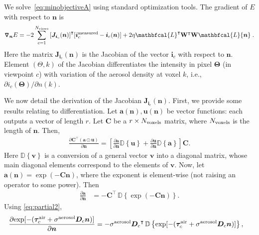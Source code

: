 \documentclass[10pt,letterpaper]{article}
\newcommand{\Grad}[1]{\bm{\triangledown_{#1}}}
\newcommand{\PartDeriv}[2]{\frac{\partial{#1}}{\partial{#2}}}
\newcommand{\vect}[1]{\bm{#1}}
\newcommand{\mat}[1]{\bm{#1}}
\newcommand{\transpose}[1]{{#1}^\intercal}
\newcommand{\OpDistance}{\bm{D}}
\newcommand{\Laplacian}{\mathbfcal{L}}
\newcommand{\OpDiag}[1]{\mathbb{D}\left\{#1\right\}}
\begin{document}
We solve~\cref{eq:minobjectiveA} using standard optimization tools.
The gradient of $E$ with respect to ${\bm n}$ is
\begin{align}
  \Grad{{\bm n}} E = -2\sum_{c=1}^{N_{\rm views}}
  \transpose{\left[{\bm J}_{{\bm i}_c}({\bm n})\right]} [{\bm i}^{\rm
    measured}_c - {\bm i}_c({\bm n})] + 2 \eta
  \transpose{\Laplacian}\transpose{{\bf W}}{\bf W}\Laplacian{\bm n}
  \;.
  \label{eq:gradient1}
\end{align}
Here the matrix ${\bm J}_{{\bm i}_c}({\bm n})$ is the Jacobian of the
vector ${\bm i}_c$ with respect to ${\bm n}$.  Element $(\Theta,k)$ of
the Jacobian differentiates the intensity in pixel ${\bm \Theta}$ (in
viewpoint $c$) with variation of the aerosol density at voxel $k$,
i.e., $\partial i_c({\bm \Theta})/\partial{n(k)}$.

We now detail the derivation of the Jacobian ${\bm J}_{{\bm i}_c}({\bm
  n})$. First, we provide some results relating to differentiation.
Let $\vect{a}(\vect{n}),\vect{u}(\vect{n})$ be vector functions: each
outputs a vector of length $r$. Let $\mat{C}$ be a $r \times N_{\rm
  voxels}$ matrix, where $N_{\rm voxels}$ is the length of ${\bm n}$.
Then,
\begin{align}
  \label{eq:partial1}
  \PartDeriv{\transpose{\mat{C}} (\vect{a} \odot \vect{u})}{\vect{n}}
  = \left[ \PartDeriv{\vect{a}}{\vect{n}} \OpDiag{\vect{u}} +
    \PartDeriv{\vect{u}}{\vect{n}} \OpDiag{\vect{a}} \right] \mat{C}.
\end{align}
Here $\OpDiag{\vect{v}}$ is a conversion of a general vector
$\vect{v}$ into a diagonal matrix, whose main diagonal elements
correspond to the elements of $\vect{v}$. Now, let
$\vect{a}(\vect{n}) = \exp(-{\mat{C}}\vect{n})$,
where the exponent is element-wise (not raising an operator to some
power). Then
\begin{align}
  \label{eq:partial2}
  \PartDeriv{\vect{a}}{\vect{n}} &= - \transpose{\mat{C}} \,
  \OpDiag{\exp(-{\mat{C}}\vect{n})}.
\end{align}
Using \cref{eq:partial2},
\begin{align}
  \label{eq:partial4}
  \PartDeriv{\exp[-(\vect{\tau}_c^{\rm air} + {\sigma}^{\rm
      aerosol}{\bm D}_c {\bm n})]}
  {\vect{n}} &= - {\sigma}^{\rm aerosol}\transpose{\OpDistance_c} \,
  \OpDiag{\exp[-(\vect{\tau}_c^{\rm air} + {\sigma}^{\rm aerosol}{\bm
      D}_c {\bm n})]},
\end{align}
\end{document}
